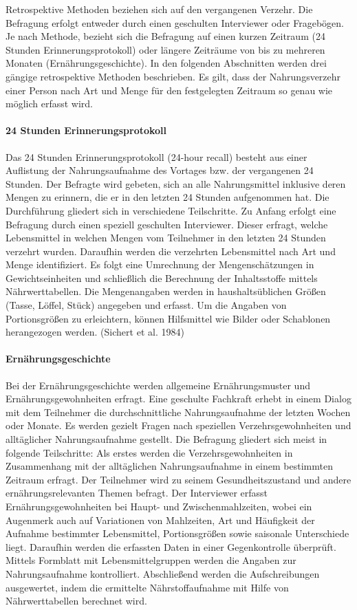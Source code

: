 Retrospektive Methoden beziehen sich auf den vergangenen Verzehr.  Die Befragung erfolgt entweder durch einen geschulten Interviewer oder Fragebögen. Je nach Methode, bezieht sich die Befragung auf einen kurzen Zeitraum (24 Stunden Erinnerungsprotokoll) oder längere Zeiträume von bis zu mehreren Monaten (Ernährungsgeschichte). In den folgenden Abschnitten werden drei gängige retrospektive Methoden beschrieben. Es gilt, dass der Nahrungsverzehr einer Person nach Art und Menge für den festgelegten Zeitraum so genau wie möglich erfasst wird.\cite{muller2007ernahrungsmedizinische}


\paragraph{24 Stunden Erinnerungsprotokoll}

Das 24 Stunden Erinnerungsprotokoll (24-hour recall) besteht aus einer Auflistung der Nahrungsaufnahme des Vortages bzw. der vergangenen 24 Stunden. Der Befragte wird gebeten, sich an alle Nahrungsmittel inklusive deren Mengen zu erinnern, die er in den letzten 24 Stunden aufgenommen hat. Die Durchführung gliedert sich in verschiedene Teilschritte. Zu Anfang erfolgt eine Befragung durch einen speziell geschulten Interviewer. Dieser erfragt, welche Lebensmittel in welchen Mengen vom Teilnehmer in den letzten 24 Stunden verzehrt wurden. Daraufhin werden die verzehrten Lebensmittel nach Art und Menge identifiziert. Es folgt eine Umrechnung der Mengenschätzungen in Gewichtseinheiten und schließlich die Berechnung der Inhaltsstoffe mittels Nährwerttabellen. Die Mengenangaben werden in haushaltsüblichen Größen (Tasse, Löffel, Stück) angegeben und erfasst. Um die Angaben von Portionsgrößen zu erleichtern, können Hilfsmittel wie Bilder oder Schablonen herangezogen werden. (Sichert et al. 1984)

\paragraph{Ernährungsgeschichte}

Bei der Ernährungsgeschichte werden allgemeine Ernährungsmuster und Ernährungsgewohnheiten erfragt. Eine geschulte Fachkraft erhebt in einem Dialog mit dem Teilnehmer die durchschnittliche Nahrungsaufnahme der letzten Wochen oder Monate. Es werden gezielt Fragen nach speziellen Verzehrsgewohnheiten und alltäglicher Nahrungsaufnahme gestellt. Die Befragung gliedert sich meist in folgende Teilschritte: Als erstes werden die Verzehrsgewohnheiten in Zusammenhang mit der alltäglichen Nahrungsaufnahme in einem bestimmten Zeitraum erfragt. Der Teilnehmer wird zu seinem Gesundheitszustand und andere ernährungsrelevanten Themen befragt. Der Interviewer erfasst Ernährungsgewohnheiten bei Haupt- und Zwischenmahlzeiten, wobei ein Augenmerk auch auf  Variationen von Mahlzeiten, Art und Häufigkeit der Aufnahme bestimmter Lebensmittel, Portionsgrößen sowie saisonale Unterschiede liegt. Daraufhin werden die erfassten Daten in einer Gegenkontrolle überprüft. Mittels Formblatt mit Lebensmittelgruppen werden die Angaben zur Nahrungsaufnahme kontrolliert. Abschließend werden die Aufschreibungen ausgewertet, indem die ermittelte Nährstoffaufnahme mit Hilfe von Nährwerttabellen berechnet wird. 

